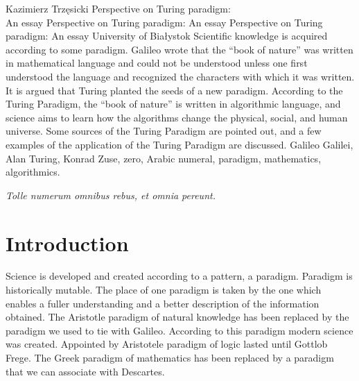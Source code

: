 \begin{artengenv}{Kazimierz Trzęsicki}
	{Perspective on Turing paradigm:\\An essay}
	{Perspective on Turing paradigm: An essay}
	{Perspective on Turing paradigm: An essay}
	{University of Białystok}
	{Scientific knowledge is acquired according to some paradigm. Galileo wrote that the ``book of nature'' was written in mathematical language and could not be understood unless one first understood the language and recognized the characters with which it was written. It is argued that Turing planted the seeds of a new paradigm. According to the Turing Paradigm, the ``book of nature'' is written in algorithmic language, and science aims to learn how the algorithms change the physical, social, and human universe. Some sources of the Turing Paradigm are pointed out, and a few examples of the application of the Turing Paradigm are discussed.
	}
	{Galileo Galilei, Alan Turing, Konrad Zuse, zero, Arabic numeral, paradigm, mathematics, algorithmics.}

 
  
\epigraph{{\footnotesize \textit{Tolle numerum omnibus rebus, et omnia pereunt.} }}{
{\footnotesize
\begin{flushleft}
\parencite[Liber III, \textit{De mathematica}, IV. \textit{Quid praestent numeri}]{Izydor1911}
\end{flushleft}
}\hfill \phantom{}}


\section{Introduction}

\lettrine[loversize=0.13,lines=2,lraise=-0.03,nindent=0em,findent=0.2pt]%
{S}{}cience is developed and created  according to a pattern, a paradigm. Paradigm is historically mutable. The place of one paradigm is taken by the one which enables a fuller understanding and a better description of the information obtained. The Aristotle paradigm of natural knowledge has been replaced by the paradigm  we used to tie with Galileo. According to this paradigm modern science was created. Appointed by Aristotele paradigm of logic lasted until Gottlob Frege. The Greek paradigm of mathematics has been replaced by a paradigm that we can associate with Descartes.


\end{artengenv}
